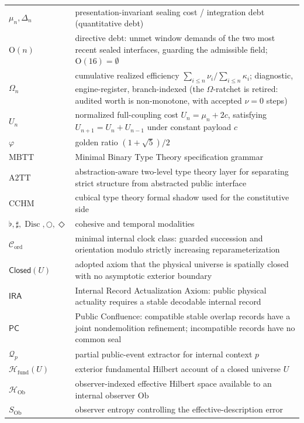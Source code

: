\documentclass[11pt]{article}
\theoremstyle{plain}
\theoremstyle{definition}
\theoremstyle{remark}
\newcommand{\MBTT}{\mathrm{MBTT}}
\newcommand{\ATwoTT}{\mathrm{A2TT}}
\newcommand{\CCHM}{\mathrm{CCHM}}
\newcommand{\Disc}{\operatorname{Disc}}
\newcommand{\Flat}{\flat}
\newcommand{\Sharp}{\sharp}
\newcommand{\Next}{\bigcirc}
\newcommand{\Eventually}{\Diamond}
\begin{document}
\begin{longtable}{@{}>{\raggedright\arraybackslash}p{}>{\raggedright\arraybackslash}p{}@{}}
\(\mu_n,\Delta_n\) & presentation-invariant sealing cost / integration debt (quantitative debt) \\
\(\mathrm{O}(n)\) & directive debt: unmet window demands of the two most recent sealed interfaces, guarding the admissible field; \(\mathrm{O}(16)=\emptyset\) \\
\(\Omega_n\) & cumulative realized efficiency \(\sum_{i\le n}\nu_i/\sum_{i\le n}\kappa_i\); diagnostic, engine-register, branch-indexed (the \(\Omega\)-ratchet is retired: audited worth is non-monotone, with accepted \(\nu=0\) steps) \\
\(U_n\) & normalized full-coupling cost \(U_n=\mu_n+2c\), satisfying \(U_{n+1}=U_n+U_{n-1}\) under constant payload \(c\) \\
\(\varphi\) & golden ratio \((1+\sqrt5)/2\) \\
\(\MBTT\) & Minimal Binary Type Theory specification grammar \\
\(\ATwoTT\) & abstraction-aware two-level type theory layer for separating strict structure from abstracted public interface \\
\(\CCHM\) & cubical type theory formal shadow used for the constitutive side \\
\(\Flat,\Sharp,\Disc,\Next,\Eventually\) & cohesive and temporal modalities \\
\(\mathcal{C}_{\mathrm{ord}}\) & minimal internal clock class: guarded succession and orientation modulo strictly increasing reparameterization \\
\(\mathsf{Closed}(U)\) & adopted axiom that the physical universe is spatially closed with no asymptotic exterior boundary \\
\(\mathsf{IRA}\) & Internal Record Actualization Axiom: public physical actuality requires a stable decodable internal record \\
\(\mathsf{PC}\) & Public Confluence: compatible stable overlap records have a joint nondemolition refinement; incompatible records have no common seal \\
\(\mathcal{Q}_p\) & partial public-event extractor for internal context \(p\) \\
\(\mathcal{H}_{\mathrm{fund}}(U)\) & exterior fundamental Hilbert account of a closed universe \(U\) \\
\(\mathcal{H}_{\mathrm{Ob}}\) & observer-indexed effective Hilbert space available to an internal observer \(\mathrm{Ob}\) \\
\(S_{\mathrm{Ob}}\) & observer entropy controlling the effective-description error \\

\end{longtable}
\end{document}
